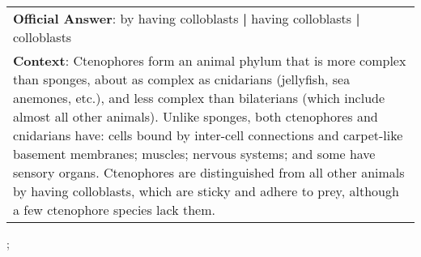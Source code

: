\begin{figure*}[ht]
{\begin{tabular}{p{}}
            \textbf{Official Answer}: by having colloblasts \textbf{|} having colloblasts \textbf{|} colloblasts                                                                                                                                                                                                                                                                                                                                                                                                                                                                                     \\
            \textbf{Context}: Ctenophores form an animal phylum that is more complex than sponges, about as complex as cnidarians (jellyfish, sea anemones, etc.), and less complex than bilaterians (which include almost all other animals). Unlike sponges, both ctenophores and cnidarians have: cells bound by inter-cell connections and carpet-like basement membranes; muscles; nervous systems; and some have sensory organs. Ctenophores are distinguished from all other animals by having colloblasts, which are sticky and adhere to prey, although a few ctenophore species lack them. \\
        \end{tabular}
    };
    \label{fig:ex-5725cb33271a42140099d1dc}
\end{figure*}

\clearpage